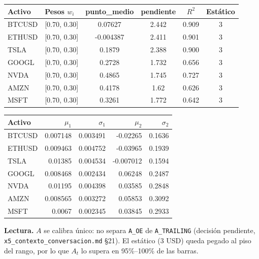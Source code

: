 \documentclass[11pt,a4paper]{article}
\newcommand{\code}[1]{\texttt{\small #1}}
\begin{document}
\begin{center}\end{center}
\begin{center}\small\setlength{\tabcolsep}{5pt}
\begin{tabular}{llcccc}\toprule
Activo & Pesos $w_i$ & punto\_medio & pendiente & $R^2$ & Estático \\\midrule
BTCUSD & [0.70, 0.30] & 0.07627 & 2.442 & 0.909 & 3 \\
ETHUSD & [0.70, 0.30] & -0.004387 & 2.411 & 0.901 & 3 \\
TSLA & [0.70, 0.30] & 0.1879 & 2.388 & 0.900 & 3 \\
GOOGL & [0.70, 0.30] & 0.2728 & 1.732 & 0.656 & 3 \\
NVDA & [0.70, 0.30] & 0.4865 & 1.745 & 0.727 & 3 \\
AMZN & [0.70, 0.30] & 0.4178 & 1.62 & 0.626 & 3 \\
MSFT & [0.70, 0.30] & 0.3261 & 1.772 & 0.642 & 3 \\
\bottomrule\end{tabular}

\medskip
\begin{tabular}{lrrrr}\toprule
Activo & $\mu_1$ & $\sigma_1$ & $\mu_2$ & $\sigma_2$ \\\midrule
BTCUSD & 0.007148 & 0.003491 & -0.02265 & 0.1636 \\
ETHUSD & 0.009463 & 0.004752 & -0.03965 & 0.1939 \\
TSLA & 0.01385 & 0.004534 & -0.007012 & 0.1594 \\
GOOGL & 0.008468 & 0.002434 & 0.06248 & 0.2487 \\
NVDA & 0.01195 & 0.004398 & 0.03585 & 0.2848 \\
AMZN & 0.008565 & 0.003272 & 0.05853 & 0.3092 \\
MSFT & 0.0067 & 0.002345 & 0.03845 & 0.2933 \\
\bottomrule\end{tabular}\end{center}
\textbf{Lectura.} $A$ se calibra único: no separa \code{A\_OE} de \code{A\_TRAILING} (decisión pendiente, \code{x5\_contexto\_conversacion.md} §21). El estático (3 USD) queda pegado al piso del rango, por lo que $A_t$ lo supera en 95\%--100\% de las barras.
\newpage
\end{document}

